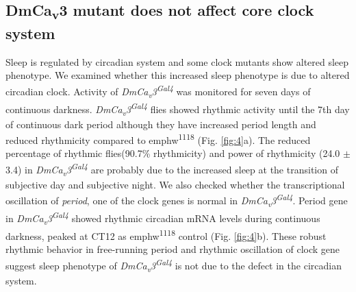 \subsection*{DmCa\textsubscript{v}3 mutant does not affect core clock system}

Sleep is regulated by circadian system and some clock mutants show altered sleep phenotype\cite{12568241, 19038223}.
We examined whether this increased sleep phenotype is due to altered circadian clock.
Activity of \emph{DmCa\textsubscript{v}3\textsuperscript{Gal4}} was monitored for seven days of continuous darkness.
\emph{DmCa\textsubscript{v}3\textsuperscript{Gal4}} flies showed rhythmic activity until the 7th day of continuous dark period although they have increased period length and reduced rhythmicity compared to emph{w\textsuperscript{1118}} (Fig. \ref{fig:4}a).  
The reduced percentage of rhythmic flies(90.7\% rhythmicity) and power of rhythmicity (24.0 $\pm$ 3.4) in \emph{DmCa\textsubscript{v}3\textsuperscript{Gal4}} are probably due to the increased sleep at the transition of subjective day and subjective night.
We also checked whether the transcriptional oscillation of \emph{period}, one of the clock genes is normal in \emph{DmCa\textsubscript{v}3\textsuperscript{Gal4}}. 
Period gene in \emph{DmCa\textsubscript{v}3\textsuperscript{Gal4}} showed rhythmic circadian mRNA levels during continuous darkness, peaked at CT12 as emph{w\textsuperscript{1118}} control (Fig. \ref{fig:4}b).
These robust rhythmic behavior in free-running period and rhythmic oscillation of clock gene suggest sleep phenotype of \emph{DmCa\textsubscript{v}3\textsuperscript{Gal4}} is not due to the defect in the circadian system. 
    
  
  
  